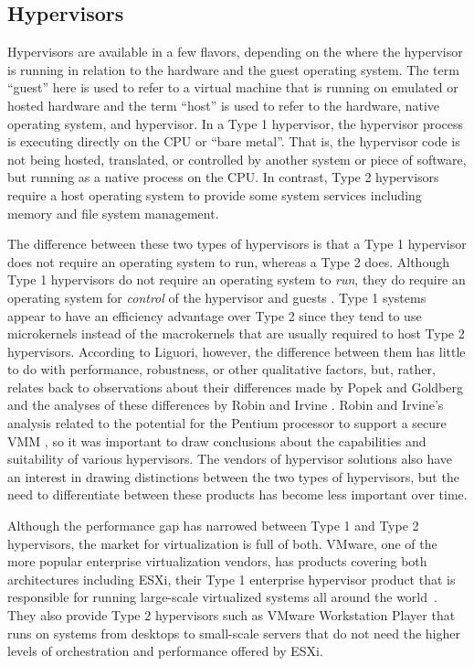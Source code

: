 \subsection{Hypervisors}
\label{sec:hypervisors}
Hypervisors are available in a few flavors, depending on the where the hypervisor is running in relation to the hardware and the guest operating system.
The term ``guest'' here is used to refer to a virtual machine that is running on emulated or hosted hardware and the term ``host'' is used to refer to the hardware, native operating system, and hypervisor.  
In a Type 1 hypervisor, the hypervisor process is executing directly on the CPU or ``bare metal''.
That is, the hypervisor code is not being hosted, translated, or controlled by another system or piece of software, but running as a native process on the CPU.
In contrast, Type 2 hypervisors require a host operating system to provide some system services including memory and file system management.

The difference between these two types of hypervisors is that a Type 1 hypervisor does not require an operating system to run, whereas a Type 2 does.
Although Type 1 hypervisors do not require an operating system to \emph{run}, they do require an operating system for \emph{control} of the hypervisor and guests \autocite{_liguori_1}.
Type 1 systems appear to have an efficiency advantage over Type 2 since they tend to use microkernels instead of the macrokernels that are usually required to host Type 2 hypervisors.
According to Liguori, however, the difference between them has little to do with performance, robustness, or other qualitative factors, but, rather, relates back to  observations about their differences made by Popek and Goldberg \autocite{_popek_1} and the analyses of these differences by Robin and Irvine \autocite{_robin_1}.
Robin and Irvine's analysis related to the potential for the Pentium processor to support a secure VMM \autocite{_robin_1}, so it was important to draw conclusions about the capabilities and suitability of various hypervisors.
The vendors of hypervisor solutions also have an interest in drawing distinctions between the two types of hypervisors, but the need to differentiate between these products has become less important over time.  

Although the performance gap has narrowed between Type 1 and Type 2 hypervisors, the market for virtualization is full of both.
VMware, one of the more popular enterprise virtualization vendors, has products covering both architectures including ESXi, their Type 1 enterprise hypervisor product that is responsible for running large-scale virtualized systems all around the world~\autocite{vmwareProducts}.
They also provide Type 2 hypervisors such as VMware Workstation Player that runs on systems from desktops to small-scale servers that do not need the higher levels of orchestration and performance offered by ESXi.

